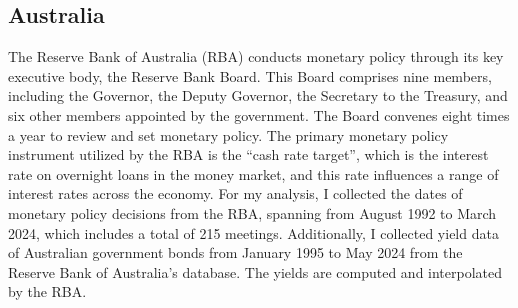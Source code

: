 \subsection{Australia}

The Reserve Bank of Australia (RBA) conducts monetary policy through its key executive body, the Reserve Bank Board. This Board comprises nine members, including the Governor, the Deputy Governor, the Secretary to the Treasury, and six other members appointed by the government. The Board convenes eight times a year to review and set monetary policy. The primary monetary policy instrument utilized by the RBA is the ``cash rate target'', which is the interest rate on overnight loans in the money market, and this rate influences a range of interest rates across the economy. For my analysis, I collected the dates of monetary policy decisions from the RBA, spanning from August 1992 to March 2024, which includes a total of 215 meetings. Additionally, I collected yield data of Australian government bonds from January 1995 to May 2024 from the Reserve Bank of Australia's database. The yields are computed and interpolated by the RBA.
